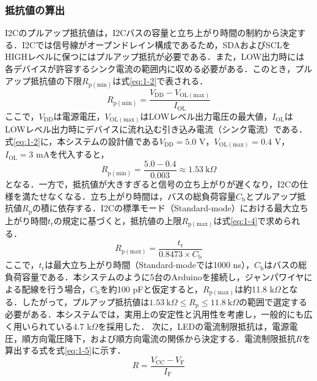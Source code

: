 \documentclass[uplatex,dvipdfmx]{jlreq}
\begin{document}
\subsubsection{抵抗値の算出}
I2Cのプルアップ抵抗値は，I2Cバスの容量と立ち上がり時間の制約から決定する．I2Cでは信号線がオープンドレイン構成であるため，SDAおよびSCLをHIGHレベルに保つにはプルアップ抵抗が必要である．また，LOW出力時には各デバイスが許容するシンク電流の範囲内に収める必要がある．このとき，プルアップ抵抗値の下限$R_{\mathrm{p(min)}}$は式\ref{eq:1-2}で表される．
\begin{equation}
    R_{\mathrm{p(min)}} = \frac{V_{\mathrm{DD}} - V_{\mathrm{OL(max)}}}{I_{\mathrm{OL}}}
    \label{eq:1-2}
\end{equation}
ここで，$V_{\mathrm{DD}}$は電源電圧，$V_{\mathrm{OL(max)}}$はLOWレベル出力電圧の最大値，$I_{\mathrm{OL}}$はLOWレベル出力時にデバイスに流れ込む引き込み電流（シンク電流）である．式\ref{eq:1-2}に，本システムの設計値である$V_{\mathrm{DD}} = 5.0$ V，$V_{\mathrm{OL(max)}} = 0.4$ V，$I_{\mathrm{OL}} = 3$ mAを代入すると，
\begin{equation}
    R_{\mathrm{p(min)}} = \frac{5.0 - 0.4}{0.003} \approx 1.53 \ \mathrm{k}\Omega
    \label{eq:1-3}
\end{equation}
となる．一方で，抵抗値が大きすぎると信号の立ち上がりが遅くなり，I2Cの仕様を満たせなくなる．立ち上がり時間は，バスの総負荷容量$C_{\mathrm{b}}$とプルアップ抵抗値$R_{\mathrm{p}}$の積に依存する．I2Cの標準モード（Standard-mode）における最大立ち上がり時間$t_{\mathrm{r}}$の規定に基づくと，抵抗値の上限$R_{\mathrm{p(max)}}$は式\ref{eq:1-4}で求められる\cite{ref:1-5}．
\begin{equation}
    R_{\mathrm{p(max)}} = \frac{t_{\mathrm{r}}}{0.8473 \times C_{\mathrm{b}}}
    \label{eq:1-4}
\end{equation}
ここで，$t_{\mathrm{r}}$は最大立ち上がり時間（Standard-modeでは1000 ns），$C_{\mathrm{b}}$はバスの総負荷容量である．本システムのように5台のArduinoを接続し，ジャンパワイヤによる配線を行う場合，$C_{\mathrm{b}}$を約100 pFと仮定すると，$R_{\mathrm{p(max)}}$は約11.8 k$\Omega$となる．したがって，プルアップ抵抗値は$1.53 \ \mathrm{k}\Omega \leq R_{\mathrm{p}} \leq 11.8 \ \mathrm{k}\Omega$の範囲で選定する必要がある．本システムでは，実用上の安定性と汎用性を考慮し，一般的にも広く用いられている4.7 k$\Omega$を採用した．
次に，LEDの電流制限抵抗は，電源電圧，順方向電圧降下，および順方向電流の関係から決定する．電流制限抵抗$R$を算出する式を式\ref{eq:1-5}に示す．
\begin{equation}
    R = \frac{V_{\mathrm{CC}} - V_{\mathrm{F}}}{I_{\mathrm{F}}}
    \label{eq:1-5}
\end{equation}
\end{document}
